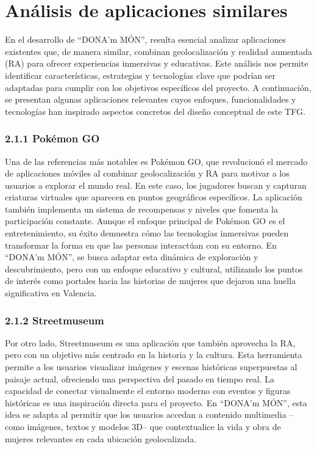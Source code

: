 
\section{Análisis de aplicaciones similares}

En el desarrollo de “DONA’m MÓN”, resulta esencial analizar aplicaciones existentes que, de manera similar, combinan geolocalización y realidad aumentada (RA) para ofrecer experiencias inmersivas y educativas. Este análisis nos permite identificar características, estrategias y tecnologías clave que podrían ser adaptadas para cumplir con los objetivos específicos del proyecto. A continuación, se presentan algunas aplicaciones relevantes cuyos enfoques, funcionalidades y tecnologías han inspirado aspectos concretos del diseño conceptual de este TFG.

\subsubsection{2.1.1 Pokémon GO}


Una de las referencias más notables es Pokémon GO, que revolucionó el mercado de aplicaciones móviles al combinar geolocalización y RA para motivar a los usuarios a explorar el mundo real. En este caso, los jugadores buscan y capturan criaturas virtuales que aparecen en puntos geográficos específicos. La aplicación también implementa un sistema de recompensas y niveles que fomenta la participación constante. Aunque el enfoque principal de Pokémon GO es el entretenimiento, su éxito demuestra cómo las tecnologías inmersivas pueden transformar la forma en que las personas interactúan con su entorno. En “DONA’m MÓN”, se busca adaptar esta dinámica de exploración y descubrimiento, pero con un enfoque educativo y cultural, utilizando los puntos de interés como portales hacia las historias de mujeres que dejaron una huella significativa en Valencia.

\subsubsection{2.1.2 Streetmuseum}

Por otro lado, Streetmuseum es una aplicación que también aprovecha la RA, pero con un objetivo más centrado en la historia y la cultura. Esta herramienta permite a los usuarios visualizar imágenes y escenas históricas superpuestas al paisaje actual, ofreciendo una perspectiva del pasado en tiempo real. La capacidad de conectar visualmente el entorno moderno con eventos y figuras históricas es una inspiración directa para el proyecto. En “DONA’m MÓN”, esta idea se adapta al permitir que los usuarios accedan a contenido multimedia –como imágenes, textos y modelos 3D– que contextualice la vida y obra de mujeres relevantes en cada ubicación geolocalizada.

